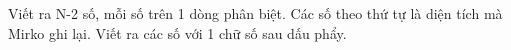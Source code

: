 Viết ra N-2 số, mỗi số trên 1 dòng phân biệt. Các số theo thứ tự là diện tích mà Mirko ghi lại. Viết ra các số với 1 chữ số sau dấu phẩy.